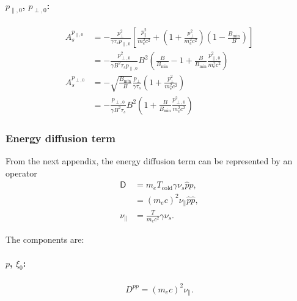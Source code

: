\documentclass[11pt,a4paper]{article}
\newcommand{\sub}[1]{\ensuremath{_{\text{#1}}}}
\begin{document}
\paragraph{$p_{\parallel,0}$, $p_{\perp,0}$:}
\begin{align}
A_s^{p_{\parallel,0}} &= - \frac{p_\perp^2}{\gamma\tau_sp_{\parallel,0}} \left[\frac{p_\parallel^2}{m_e^2c^2}+\left(1+\frac{p_\perp^2}{m_e^2c^2}\right)\left(1-\frac{B\sub{min}}{B}\right)\right] \nonumber \\
&= -\frac{p_{\perp,0}^2}{\gamma B^2\tau_s p_{\parallel,0}}B^2\left(\frac{B}{B\sub{min}}-1 + \frac{B}{B\sub{min}}\frac{p_{\parallel,0}^2}{m_e^2 c^2}\right) \nonumber\\
A_s^{p_{\perp,0}} &= -\sqrt{\frac{B\sub{min}}{B}}\frac{p_\perp}{\gamma\tau_s}\left(1+\frac{p_\perp^2}{m_e^2c^2}\right) \nonumber \\
&=  -\frac{p_{\perp,0}}{\gamma B^2\tau_s}B^2\left(1+\frac{B}{B\sub{min}}\frac{p_{\perp,0}^2}{m_e^2c^2}\right) 
\end{align}



\subsubsection*{Energy diffusion term}
From the next appendix, the energy diffusion term can be represented by an operator
\begin{align}
\mathsf{D} &= m_e  T\sub{cold} \gamma \nu_s \hat{p}\hat{p}, \nonumber \\
&= (m_e c)^2 \nu_\parallel \hat{p}\hat{p} , \\
\nu_\parallel &= \frac{T}{m_e c^2}\gamma \nu_s .
\end{align}

The components are:

\paragraph{$p$, $\xi_0$:}
\begin{align}
D^{pp} = (m_e c)^2 \nu_\parallel .
\end{align}
\end{document}
